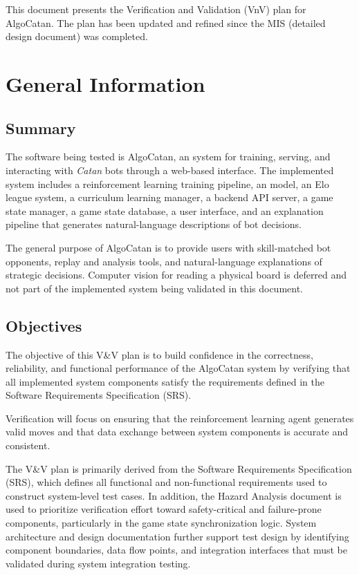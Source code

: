 \documentclass[12pt, titlepage]{article}
\begin{document}
\newpage


This document presents the Verification and Validation (VnV) plan for AlgoCatan.
The plan has been updated and refined since the MIS (detailed design document) was completed.


\section{General Information}

\subsection{Summary}



The software being tested is AlgoCatan, an \AI{} system for training, serving,
and interacting with \emph{Catan} bots through a web-based interface.
The implemented system includes a reinforcement learning training pipeline,
an \AI{} model, an Elo league system, a curriculum learning manager,
a backend API server, a game state manager, a game state database,
a user interface, and an explanation pipeline that generates natural-language
descriptions of bot decisions.

The general purpose of AlgoCatan is to provide users with skill-matched bot
opponents, replay and analysis tools, and natural-language explanations of
strategic decisions.
Computer vision for reading a physical board is deferred
and not part of the implemented system being validated in this document.

\subsection{Objectives}

  The objective of this V\&V plan is to build confidence in the correctness, 
  reliability, and functional performance of the AlgoCatan system by verifying
  that all implemented system components satisfy the requirements defined in 
  the Software Requirements Specification (SRS).
  
  Verification will focus on ensuring that the reinforcement learning agent
   generates valid moves and that data exchange between system components is 
   accurate and consistent.
  
  The V\&V plan is primarily derived from the Software Requirements Specification 
  (SRS), which defines all functional and non-functional requirements used to
   construct system-level test cases. In addition, the Hazard Analysis document
    is used to prioritize verification effort toward safety-critical and 
    failure-prone components, particularly in the game state synchronization logic.
     System architecture and design documentation further support test design by 
     identifying component boundaries, data flow points, and integration interfaces
      that must be validated during system integration testing.
  
\end{document}
